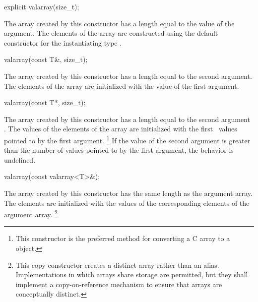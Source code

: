 \documentclass[american,twoside]{book}
\begin{document}
\begin{paras}
\begin{itemdecl}
explicit valarray(size_t);
\end{itemdecl}

\begin{itemdescr}
\pnum
The array created by this constructor has a length equal to the value of the argument.
The elements of the array are constructed using the default constructor for the
instantiating type .
\end{itemdescr}

\begin{itemdecl}
valarray(const T&, size_t);
\end{itemdecl}

\begin{itemdescr}
\pnum
The array created by this constructor has a length equal to the second
argument.
The elements of the array are initialized with the value of the first argument.
\end{itemdescr}

\begin{itemdecl}
valarray(const T*, size_t);
\end{itemdecl}

\begin{itemdescr}
\pnum
The array created by this constructor has a length equal to the second
argument
.
The values of the elements of the array are initialized with the
first
\
values pointed to by the first argument.%
\footnote{
This constructor is the preferred method for converting a C array to a
\tcode{valarray}
object.
}
If the value of the second argument is greater than the number of values
pointed to by the first argument, the behavior is undefined.%
\end{itemdescr}

\begin{itemdecl}
valarray(const valarray<T>&);
\end{itemdecl}

\begin{itemdescr}
\pnum
The array created by this constructor has the same length as the argument
array.
The elements are initialized with the values of the corresponding
elements of the argument array.%
\footnote{
This copy constructor creates a distinct array rather than an alias.
Implementations in which arrays share storage are permitted, but they
shall implement a copy-on-reference mechanism to ensure that arrays are
conceptually distinct.
}
\end{itemdescr}


\end{paras}
\end{document}
